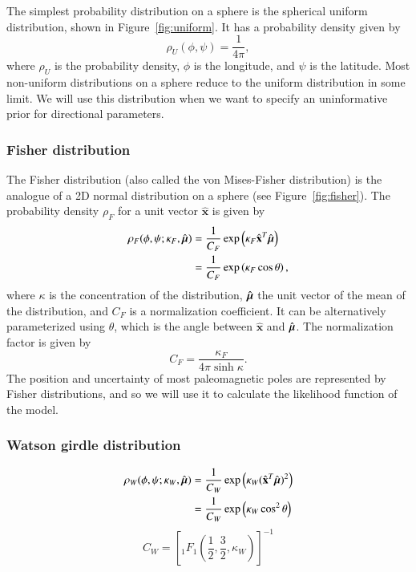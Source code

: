 \documentclass[preprint,12pt,authoryear]{elsarticle}
\newcommand{\mitbf}[1]{\hbox{\mathversion{bold}$#1$}}
\begin{document}
The simplest probability distribution on a sphere is the spherical uniform distribution, shown in Figure~\ref{fig:uniform}.
It has a probability density given by
\begin{equation}
  \rho_U(\phi, \psi) = \frac{1}{4 \pi},
\end{equation}
where $\rho_U$ is the probability density, $\phi$ is the longitude, and $\psi$ is the latitude.
Most non-uniform distributions on a sphere reduce to the uniform distribution in some limit.
We will use this distribution when we want to specify an uninformative prior for directional parameters.

\subsubsection{Fisher distribution}
The Fisher distribution (also called the von Mises-Fisher distribution) is the analogue
of a 2D normal distribution on a sphere (see Figure~\ref{fig:fisher}).
The probability density $\rho_F$ for a unit vector $\hat{\mathbf{x}}$ is given by
\begin{equation}
  \begin{aligned}
  \rho_F(\phi, \psi ; \kappa_F, \hat{\mitbf{\mu}}) 
  &= \frac{1}{C_F} \exp \left( \kappa_F \hat{\mathbf{x}}^T \hat{\mitbf{\mu}} \right) \\
  &= \frac{1}{C_F} \exp \left( \kappa_F \cos \theta \right),
  \end{aligned}
\end{equation}
where $\kappa$ is the concentration of the distribution, 
$\hat{\mitbf{\mu}}$ the unit vector of the mean of the distribution, 
and $C_F$ is a normalization coefficient. It can be alternatively
parameterized using $\theta$, which is the angle between $\hat{\mathbf{x}}$ and $\hat{\mitbf{\mu}}$.
The normalization factor is given by 
\begin{equation}
  C_F = \frac{\kappa_F}{4 \pi \sinh{\kappa}}.
\end{equation}
The position and uncertainty of most paleomagnetic poles are represented by Fisher distributions,
and so we will use it to calculate the likelihood function of the model.

\subsubsection{Watson girdle distribution}
\begin{equation}
  \begin{aligned}
  \rho_W(\phi, \psi; \kappa_W, \hat{\mitbf{\mu}}) 
  &= \frac{1}{C_W} \exp \left( \kappa_W (\hat{\mathbf{x}}^T \hat{\mitbf{\mu}})^2 \right) \\
  &= \frac{1}{C_W} \exp \left( \kappa_W \cos^2 \theta \right)
  \end{aligned}
\end{equation}
\begin{equation}
  C_W = \left[ {}_1 F_1 \left( \frac{1}{2}, \frac{3}{2}, \kappa_W \right) \right]^{-1}
\end{equation}
\end{document}
